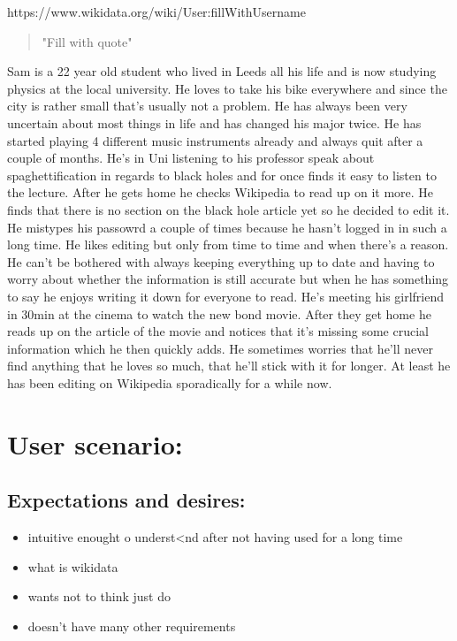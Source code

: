 \documentclass{article}
\begin{document}
\pagebreak

https://www.wikidata.org/wiki/User:fillWithUsername
\begin{quote}
"Fill with quote"
\end{quote}

Sam is a 22 year old student who lived in Leeds all his life and is now studying physics at the local university. He loves to take his bike everywhere and since the city is rather small that's usually not a problem. He has always been very uncertain about most things in life and has changed his major twice. He has started playing 4 different music instruments already and always quit after a couple of months. 
He's in Uni listening to his professor speak about spaghettification in regards to black holes and for once finds it easy to listen to the lecture. After he gets home he checks Wikipedia to read up on it more. He finds that there is no section on the black hole article yet so he decided to edit it. He mistypes his passowrd a couple of times because he hasn't logged in in such a long time. He likes editing but only from time to time and when there's a reason. He can't be bothered with always keeping everything up to date and having to worry about whether the information is still accurate but when he has something to say he enjoys writing it down for everyone to read. He's meeting his girlfriend in 30min at the cinema to watch the new bond movie. After they get home he reads up on the article of the movie and notices that it's missing some crucial information which he then quickly adds. He sometimes worries that he'll never find anything that he loves so much, that he'll stick with it for longer. At least he has been editing on Wikipedia sporadically for a while now. 

\section{User scenario:}
\subsection{Expectations and desires:}
\begin{itemize}
\item intuitive enought o underst<nd after not having used for a long time
\item what is wikidata
\item wants not to think just do
\item doesn't have many other requirements
\end{itemize}
\end{document}
